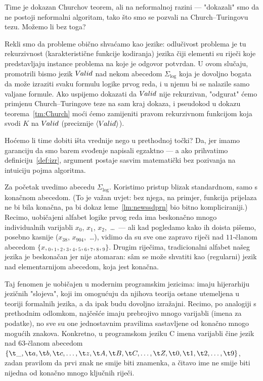 Time je dokazan Churchov teorem, ali na neformalnoj razini --- "dokazali" smo da ne postoji neformalni algoritam, tako što smo se pozvali na Church--\!Turingovu tezu. Možemo li bez toga?

Rekli smo da probleme obično shvaćamo kao jezike: odlučivost problema je tu rekurzivnost (karakteristične funkcije kodiranja) jezika čiji elementi su riječi koje predstavljaju instance problema na koje je odgovor potvrdan. U ovom slučaju, promotrili bismo jezik $V\mspace{-1.5mu}alid$ nad nekom abecedom $\Sigma_{\log}$ koja je dovoljno bogata da može izraziti svaku formulu logike prvog reda, i u njemu bi se nalazile samo valjane formule. Ako uspijemo dokazati da $V\mspace{-1.5mu}alid$ nije rekurzivan, "odgurat" ćemo primjenu Church--\!Turingove teze na sam kraj dokaza, i pseudokod u dokazu teorema~\ref{tm:Church} moći ćemo zamijeniti pravom rekurzivnom funkcijom koja svodi $K$ na $V\mspace{-1.5mu}alid$ (preciznije $\langle V\mspace{-1.5mu}alid\rangle$).

Hoćemo li time dobiti išta vrednije nego u prethodnoj točki? Da, jer imamo garanciju da smo barem svođenje napisali egzaktno --- a ako prihvatimo definiciju~\ref{def:izr}, argument postaje sasvim matematički bez pozivanja na intuiciju pojma algoritma.

Za početak uvedimo abecedu $\Sigma_{\log}$. Koristimo pristup blizak standardnom, samo s konačnom abecedom. (To je važan uvjet: bez njega, na primjer, funkcija prijelaza ne bi bila konačna, pa bi dokaz leme~\ref{lm:newssdprn} bio bitno kompliciraniji.) Recimo, uobičajeni alfabet logike prvog reda ima beskonačno mnogo individualnih varijabli $x_0$, $x_1$, $x_2$,~\ldots\ --- ali kad pogledamo kako ih doista pišemo, posebno kasnije ($x_{38}$, $x_{904}$,~\ldots), vidimo da su sve one zapravo riječi nad $11$-članom abecedom $\{x,{}_0,{}_1,{}_2,{}_3,{}_4,{}_5,{}_6,{}_7,{}_8,{}_9\}$. Drugim riječima, tradicionalni alfabet našeg jezika je beskonačan jer nije atomaran: sâm se može shvatiti kao (regularni) jezik nad elementarnijom abecedom, koja jest konačna.

Taj fenomen je uobičajen u modernim programskim jezicima: imaju hijerarhiju jezičnih "slojeva", koji im omogućuju da njihova teorija ostane utemeljena u teoriji formalnih jezika, a da ipak budu dovoljno izražajni. Recimo, po analogiji s prethodnim odlomkom, najčešće imaju prebrojivo mnogo varijabli (imena za podatke), no sve su one jednostavnim pravilima sastavljene od konačno mnogo mogućih znakova. Konkretno, u programskom jeziku C imena varijabli čine jezik nad $63$-članom abecedom $\{\t\_,\t a,\t b,\t c,\dotsc,\t z,\t A,\t B,\t C,\dotsc,\t Z,\t 0,\t 1,\t 2,\dotsc,\t 9\}$, zadan pravilom da prvi znak ne smije biti znamenka, a čitavo ime ne smije biti nijedna od konačno mnogo ključnih riječi.

